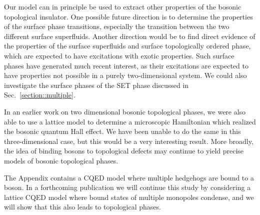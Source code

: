 \documentclass[prb,twocolumn]{revtex4-1}
\begin{document}
Our model can in principle be used to extract other properties of the bosonic topological insulator. One possible future direction is to determine the properties of the surface phase transitions, especially the transition between the two different surface superfluids. Another direction would be to find direct evidence of the properties of the surface superfluids and surface topologically ordered phase, which are expected to have excitations with exotic properties. Such surface phases have generated much recent interest, as their excitations are expected to have properties not possible in a purely two-dimensional system.\cite{SenthilVishwanath,Chen2014,Cho2014} We could also investigate the surface phases of the SET phase discussed in Sec.~\ref{section::multiple}.


In an earlier work on two dimensional bosonic topological phases,\cite{FQHE} we were also able to use a lattice model to determine a microscopic Hamiltonian which realized the bosonic quantum Hall effect. We have been unable to do the same in this three-dimensional case, but this would be a very interesting result. More broadly, the idea of binding bosons to topological defects may continue to yield precise models of bosonic topological phases.

The Appendix contains a CQED model where multiple hedgehogs are bound to a boson. In a forthcoming publication we will continue this study by considering a lattice CQED model where bound states of multiple monopoles condense, and we will show that this also leads to topological phases. 

\appendix
\end{document}
